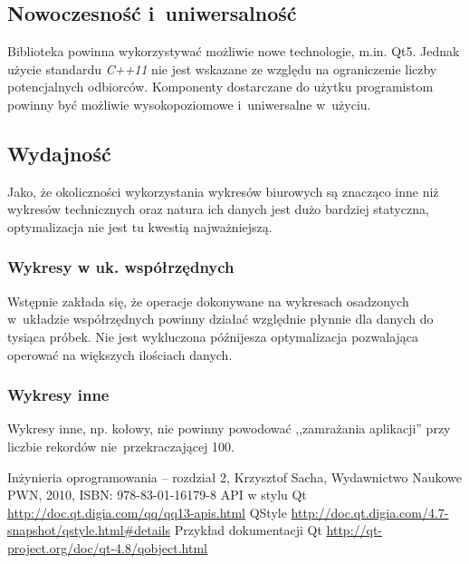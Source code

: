 \documentclass[11pt,twoside,a4paper,final]{article}
\begin{document}
\subsection{Nowoczesność i~uniwersalność}
Biblioteka powinna wykorzystywać możliwie nowe technologie, m.in. Qt5. Jednak użycie standardu \textit{C++11} nie jest wskazane ze względu na ograniczenie liczby potencjalnych odbiorców. Komponenty dostarczane do użytku programistom powinny być możliwie wysokopoziomowe i~uniwersalne w~użyciu.

\subsection{Wydajność}
Jako, że okoliczności wykorzystania wykresów biurowych są znacząco inne niż wykresów technicznych oraz natura ich danych jest dużo bardziej statyczna, optymalizacja nie jest tu kwestią najważniejszą. 

\subsubsection{Wykresy w uk. współrzędnych}
Wstępnie zakłada się, że operacje dokonywane na wykresach osadzonych w~układzie współrzędnych powinny działać względnie płynnie dla danych do tysiąca próbek. Nie jest wykluczona późnijesza optymalizacja
pozwalająca operować na większych ilościach danych.

\subsubsection{Wykresy inne}
Wykresy inne, np. kołowy, nie powinny powodować ,,zamrażania aplikacji'' przy liczbie rekordów nie~przekraczającej 100. 


\begin{thebibliography}{}
Inżynieria oprogramowania -- rozdział 2, Krzysztof Sacha, Wydawnictwo Naukowe PWN, 2010, ISBN: 978-83-01-16179-8
API w stylu Qt \url{http://doc.qt.digia.com/qq/qq13-apis.html}
QStyle \url{http://doc.qt.digia.com/4.7-snapshot/qstyle.html#details}
Przykład dokumentacji Qt \url{http://qt-project.org/doc/qt-4.8/qobject.html}

\end{thebibliography}
\end{document}

